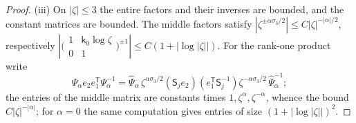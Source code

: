 \begin{proof}
(iii) On $|\zeta|\le3$ the entire factors and their inverses are bounded, and the constant matrices are bounded. The
middle factors satisfy $|\zeta^{\pm\alpha\sigma_3/2}|\le C|\zeta|^{-|\alpha|/2}$, respectively
$|\bigl(\begin{smallmatrix}1&\mathsf k_0\log\zeta\\0&1\end{smallmatrix}\bigr)^{\pm1}|\le C(1+|\log|\zeta||)$. For the
rank-one product write
\[
  \Psi_\alpha e_2e_1^{\mathsf T}\Psi_\alpha^{-1}=\hat\Psi_\alpha\,\zeta^{\alpha\sigma_3/2}
  (\mathsf S_je_2)(e_1^{\mathsf T}\mathsf S_j^{-1})\zeta^{-\alpha\sigma_3/2}\,\hat\Psi_\alpha^{-1};
\]
the entries of the middle matrix are constants times $1,\zeta^{\alpha},\zeta^{-\alpha}$, whence the bound $C|\zeta|^{-|\alpha|}$; for $\alpha=0$ the
same computation gives entries of size $(1+|\log|\zeta||)^2$.
\end{proof}


